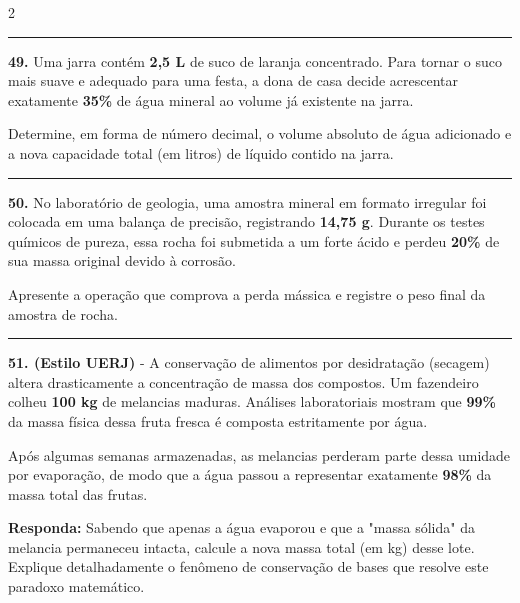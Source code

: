 \documentclass[twoside, 10pt, a4paper]{article}
\newlength{\espacoPreQuestao}
\newlength{\espacoQuestao}
\begin{document}
\begin{multicols*}{2}
\noindent\textcolor{CorLinha}{\rule{\linewidth}{0.5pt}} 
\par\vspace{\espacoPreQuestao}
\textbf{49.} Uma jarra contém \textbf{2,5 L} de suco de laranja concentrado. Para tornar o suco mais suave e adequado para uma festa, a dona de casa decide acrescentar exatamente \textbf{35\%} de água mineral ao volume já existente na jarra.

Determine, em forma de número decimal, o volume absoluto de água adicionado e a nova capacidade total (em litros) de líquido contido na jarra.
\par\vspace{\espacoQuestao}

\noindent\textcolor{CorLinha}{\rule{\linewidth}{0.5pt}} 
\par\vspace{\espacoPreQuestao}
\textbf{50.} No laboratório de geologia, uma amostra mineral em formato irregular foi colocada em uma balança de precisão, registrando \textbf{14,75 g}. Durante os testes químicos de pureza, essa rocha foi submetida a um forte ácido e perdeu \textbf{20\%} de sua massa original devido à corrosão.

Apresente a operação que comprova a perda mássica e registre o peso final da amostra de rocha.
\par\vspace{\espacoQuestao}

\noindent\textcolor{CorLinha}{\rule{\linewidth}{0.5pt}} 
\par\vspace{\espacoPreQuestao}
\textbf{51. (Estilo UERJ)} - A conservação de alimentos por desidratação (secagem) altera drasticamente a concentração de massa dos compostos. Um fazendeiro colheu \textbf{100 kg} de melancias maduras. Análises laboratoriais mostram que \textbf{99\%} da massa física dessa fruta fresca é composta estritamente por água.

Após algumas semanas armazenadas, as melancias perderam parte dessa umidade por evaporação, de modo que a água passou a representar exatamente \textbf{98\%} da massa total das frutas. 
\begin{boxresponda}
\textbf{Responda:} Sabendo que apenas a água evaporou e que a "massa sólida" da melancia permaneceu intacta, calcule a nova massa total (em kg) desse lote. Explique detalhadamente o fenômeno de conservação de bases que resolve este paradoxo matemático.
\end{boxresponda}
\par\vspace{\espacoQuestao}


\end{multicols*}
\end{document}
